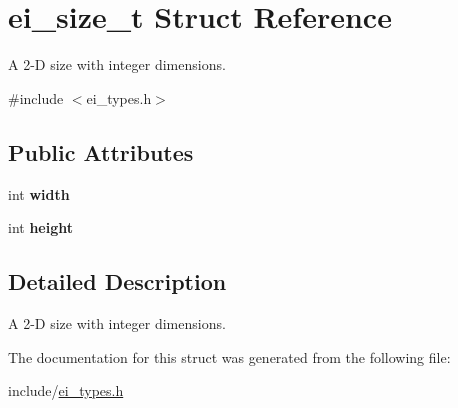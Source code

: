 \hypertarget{structei__size__t}{}\section{ei\+\_\+size\+\_\+t Struct Reference}
\label{structei__size__t}


A 2-\/D size with integer dimensions.  




{\ttfamily \#include $<$ei\+\_\+types.\+h$>$}

\subsection*{Public Attributes}
\begin{DoxyCompactItemize}
\item 
\mbox{\label{structei__size__t_a981037618942814a4318a4c27cdaecc1}} 
int {\bfseries width}
\item 
\mbox{\label{structei__size__t_a2f152e26c90d01cac2b337ebc118a5f1}} 
int {\bfseries height}
\end{DoxyCompactItemize}


\subsection{Detailed Description}
A 2-\/D size with integer dimensions. 

The documentation for this struct was generated from the following file\+:\begin{DoxyCompactItemize}
\item 
include/\hyperlink{ei__types_8h}{ei\+\_\+types.\+h}\end{DoxyCompactItemize}
